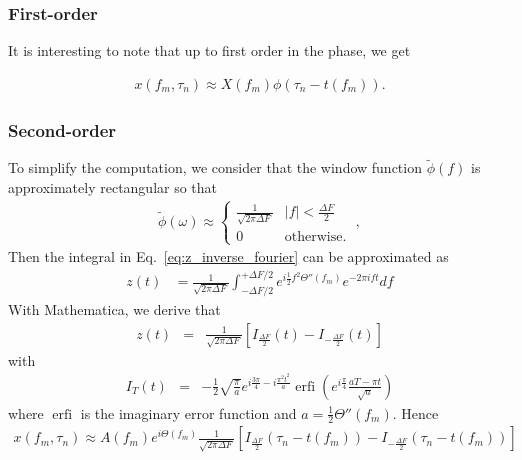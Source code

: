 \documentclass{article}
\begin{document}
\subsubsection{First-order}
It is interesting to note that up to first order in the phase, we get

\begin{align}
\label{eq:wdft-continuous-taylor-first-order}
    x(f_m, \tau_n) \approx X(f_m) \phi\left(\tau_n - t(f_m) \right).
\end{align}

\subsubsection{Second-order}

To simplify the computation, we consider that the window function $\tilde{\phi}(f)$ is approximately rectangular so that
\begin{align}
\label{eq:meyer_window_freq_approx}
\tilde\phi(\omega) \approx \left\{\begin{array}{lr}
\frac{1}{\sqrt{2 \pi \Delta F }} & |f| < \frac{\Delta F}{2}\\
0 & \text{otherwise.}
\end{array}\right.\;,
\end{align}
Then the integral in Eq.~\eqref{eq:z_inverse_fourier} can be approximated as
\begin{align}
\label{eq:z_inverse_fourier-2}
    z(t) & = \frac{1}{\sqrt{2 \pi \Delta F }} \int_{-\Delta F/2}^{+\Delta F/2} e^{i\frac{1}{2} f^2 \Theta''(f_m)} e^{-2\pi i f t} df
\end{align}
 With Mathematica, we derive that 
\begin{eqnarray}
    z(t) & = & \frac{1}{\sqrt{2 \pi \Delta F }} \left[I_{\frac{\Delta F}{2}}(t) - I_{-\frac{\Delta F}{2}}(t)  \right] 
\end{eqnarray}
with
\begin{eqnarray}
    I_{T}(t) & = & -\frac{1}{2} \sqrt{\frac{\pi}{a}} e^{i\frac{3 \pi}{4} - i \frac{\pi^2 t^2}{a}} \operatorname{erfi}\left( e^{i\frac{\pi}{4}} \frac{aT - \pi t}{\sqrt{a}}\right)
\end{eqnarray}
where $\operatorname{erfi}$ is the imaginary error function and $a = \frac{1}{2} \Theta''(f_m)$.
Hence
\begin{align}%
\label{eq:wdft-continuous-taylor-second-order}
    x(f_m, \tau_n) \approx A(f_m) e^{i\Theta(f_m)} \frac{1}{\sqrt{2 \pi \Delta F }} \left[I_{\frac{\Delta F}{2}}(\tau_n - t(f_m)) - I_{-\frac{\Delta F}{2}}(\tau_n - t(f_m))  \right] 
\end{align}
\end{document}
